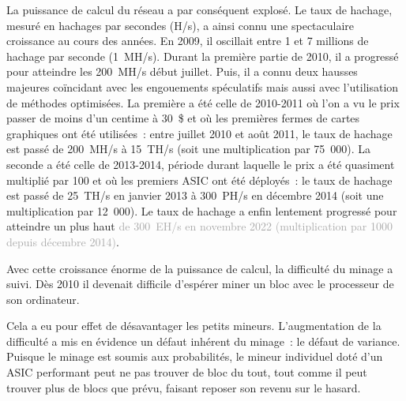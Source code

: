 
La puissance de calcul du réseau a par conséquent explosé. Le taux de hachage, mesuré en hachages par secondes (H/s), a ainsi connu une spectaculaire croissance au cours des années. En 2009, il oscillait entre 1 et 7 millions de hachage par seconde (1~MH/s). Durant la première partie de 2010, il a progressé pour atteindre les 200~MH/s début juillet. Puis, il a connu deux hausses majeures coïncidant avec les engouements spéculatifs mais aussi avec l'utilisation de méthodes optimisées. La première a été celle de 2010-2011 où l'on a vu le prix passer de moins d'un centime à 30~\$ et où les premières fermes de cartes graphiques ont été utilisées~: entre juillet 2010 et août 2011, le taux de hachage est passé de 200~MH/s à 15~TH/s (soit une multiplication par 75~000). La seconde a été celle de 2013-2014, période durant laquelle le prix a été quasiment multiplié par 100 et où les premiers ASIC ont été déployés~: le taux de hachage est passé de 25~TH/s en janvier 2013 à 300~PH/s en décembre 2014 (soit une multiplication par 12~000). Le taux de hachage a enfin lentement progressé pour atteindre un plus haut \textcolor{darkgray}{de 300~EH/s en novembre 2022 (multiplication par 1000 depuis décembre 2014)}.


Avec cette croissance énorme de la puissance de calcul, la difficulté du minage a suivi. Dès 2010 il devenait difficile d'espérer miner un bloc avec le processeur de son ordinateur.

Cela a eu pour effet de désavantager les petits mineurs. L'augmentation de la difficulté a mis en évidence un défaut inhérent du minage~: le défaut de variance. Puisque le minage est soumis aux probabilités, le mineur individuel doté d'un ASIC performant peut ne pas trouver de bloc du tout, tout comme il peut trouver plus de blocs que prévu, faisant reposer son revenu sur le hasard.

